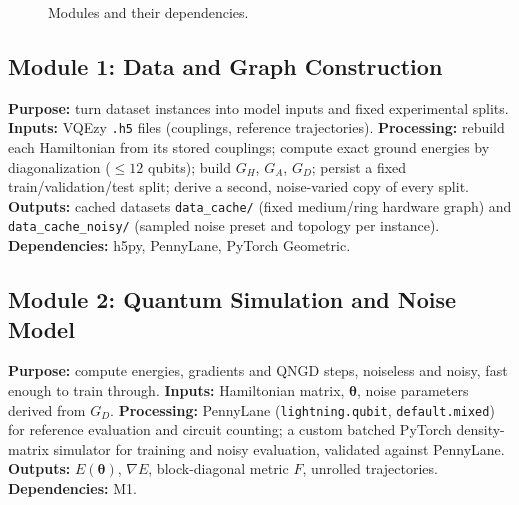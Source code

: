 \documentclass{ssnreview}
\begin{document}
\begin{figure}[H]
\centering
{}
\caption{Modules and their dependencies.}\label{fig:modules}
\end{figure}

\subsection{Module 1: Data and Graph Construction}
\textbf{Purpose:} turn dataset instances into model inputs and fixed experimental splits.
\textbf{Inputs:} VQEzy \texttt{.h5} files (couplings, reference trajectories).
\textbf{Processing:} rebuild each Hamiltonian from its stored couplings; compute exact ground
energies by diagonalization ($\le 12$ qubits); build $G_H$, $G_A$, $G_D$; persist a fixed
train/validation/test split; derive a second, noise-varied copy of every split.
\textbf{Outputs:} cached datasets \texttt{data\_cache/} (fixed medium/ring hardware graph) and
\texttt{data\_cache\_noisy/} (sampled noise preset and topology per instance).
\textbf{Dependencies:} h5py, PennyLane, PyTorch Geometric.

\subsection{Module 2: Quantum Simulation and Noise Model}
\textbf{Purpose:} compute energies, gradients and QNGD steps, noiseless and noisy, fast enough
to train through. \textbf{Inputs:} Hamiltonian matrix, $\boldsymbol\theta$, noise parameters
derived from $G_D$. \textbf{Processing:} PennyLane (\texttt{lightning.qubit},
\texttt{default.mixed}) for reference evaluation and circuit counting; a custom batched
PyTorch density-matrix simulator for training and noisy evaluation, validated against
PennyLane. \textbf{Outputs:} $E(\boldsymbol\theta)$, $\nabla E$, block-diagonal metric $F$,
unrolled trajectories. \textbf{Dependencies:} M1.
\end{document}
